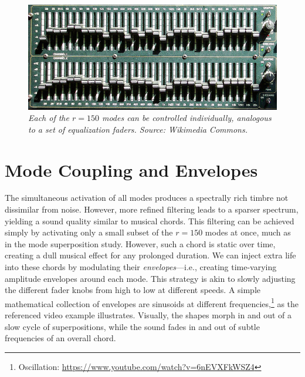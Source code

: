 \begin{figure}
	\centering
	\includegraphics[width=\textwidth]{chap6/figures/faders.jpg}
	\caption{\em Each of the $r = 150$ modes can be controlled individually, analogous to a set of equalization faders. Source: Wikimedia Commons.}
\label{fig:faders}
\end{figure}

\section{Mode Coupling and Envelopes}
The simultaneous activation of all modes produces a spectrally rich timbre not dissimilar from noise. However, more refined filtering leads to a sparser spectrum, yielding a sound quality similar to musical chords. This filtering
can be achieved simply by activating only a small subset of the $r = 150$ modes at once, much as in the mode superposition study. However, such a chord is static over time, creating a dull musical effect for any prolonged 
duration. We can inject extra life into these chords by modulating their {\em envelopes}---i.e., creating time-varying amplitude envelopes around each mode. This strategy is akin to slowly adjusting the different fader knobs 
from high to low at different speeds. A simple mathematical collection of envelopes are sinusoids at different frequencies,\footnote{Oscillation: \url{https://www.youtube.com/watch?v=6nEVXFkWSZ4}} as the referenced video example illustrates. Visually, the shapes morph in and out of a slow cycle of superpositions, while the sound fades in and out of subtle frequencies of an overall chord.

